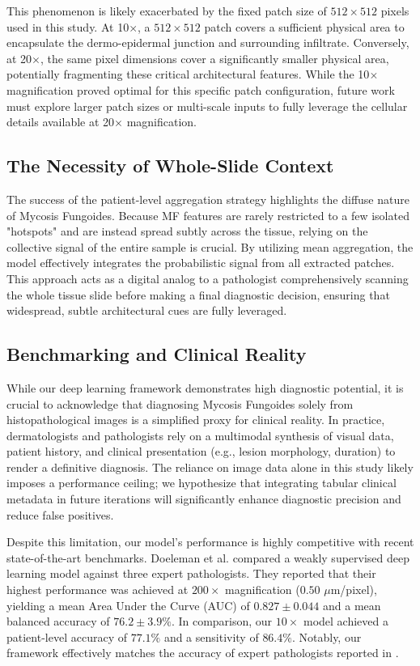 \documentclass[runningheads]{llncs}
\begin{document}
This phenomenon is likely exacerbated by the fixed patch size of $512 \times 512$ pixels used in this study. At 10$\times$, a $512 \times 512$ patch covers a sufficient physical area to encapsulate the dermo-epidermal junction and surrounding infiltrate. Conversely, at 20$\times$, the same pixel dimensions cover a significantly smaller physical area, potentially fragmenting these critical architectural features. While the 10$\times$ magnification proved optimal for this specific patch configuration, future work must explore larger patch sizes or multi-scale inputs to fully leverage the cellular details available at 20$\times$ magnification.

\subsection{The Necessity of Whole-Slide Context}
The success of the patient-level aggregation strategy highlights the diffuse nature of Mycosis Fungoides. Because MF features are rarely restricted to a few isolated "hotspots" and are instead spread subtly across the tissue, relying on the collective signal of the entire sample is crucial. By utilizing mean aggregation, the model effectively integrates the probabilistic signal from all extracted patches. This approach acts as a digital analog to a pathologist comprehensively scanning the whole tissue slide before making a final diagnostic decision, ensuring that widespread, subtle architectural cues are fully leveraged.

\subsection{Benchmarking and Clinical Reality}
While our deep learning framework demonstrates high diagnostic potential, it is crucial to acknowledge that diagnosing Mycosis Fungoides solely from histopathological images is a simplified proxy for clinical reality. In practice, dermatologists and pathologists rely on a multimodal synthesis of visual data, patient history, and clinical presentation (e.g., lesion morphology, duration) to render a definitive diagnosis. The reliance on image data alone in this study likely imposes a performance ceiling; we hypothesize that integrating tabular clinical metadata in future iterations will significantly enhance diagnostic precision and reduce false positives.

Despite this limitation, our model's performance is highly competitive with recent state-of-the-art benchmarks. Doeleman et al. \cite{Doeleman2024-MF} compared a weakly supervised deep learning model against three expert pathologists. They reported that their highest performance was achieved at $200\times$ magnification ($0.50$ $\mu$m/pixel), yielding a mean Area Under the Curve (AUC) of $0.827 \pm 0.044$ and a mean balanced accuracy of $76.2 \pm 3.9\%$. In comparison, our $10\times$ model achieved a patient-level accuracy of $77.1\%$ and a sensitivity of $86.4\%$. Notably, our framework effectively matches the accuracy of expert pathologists reported in \cite{Doeleman2024-MF}.
\end{document}
